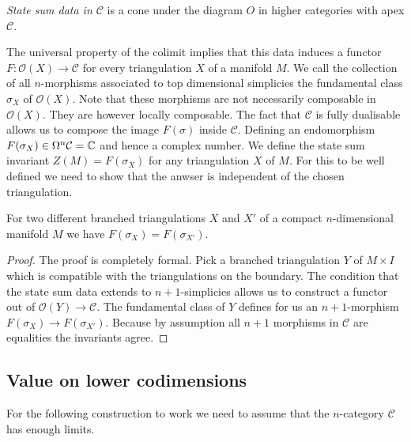 \begin{definition}
	\emph{State sum data in $\mathcal{C}$} is a cone under the diagram $O$ in higher categories with apex $\mathcal{C}$.
\end{definition}

The universal property of the colimit implies that this data induces a functor $F\colon \mathcal{O}(X)\longrightarrow \mathcal{C} $ for every triangulation $X$ of a manifold $M$.
We call the collection of all $n$-morphisms associated to top dimensional simplicies the fundamental class $\sigma_X$ of $\mathcal{O}(X)$.
Note that these morphisms are not necessarily composable in $\mathcal{O}(X)$.
They are however locally composable.
The fact that $\mathcal{C}$ is fully dualisable
allows us to compose the image $F(\sigma)$ inside $\mathcal{C}$.
Defining an endomorphism
$F(\sigma_X)\in \Omega^n\mathcal{C}=\mathbb{C} $ and hence a complex number.
We define the state sum invariant $Z(M)=F(\sigma_X)$ for any triangulation $X$ of $M$.
For this to be well defined we need to show that the anwser is independent of the chosen triangulation.

\begin{theorem}
For two different branched triangulations $X$ and $X'$ of a compact $n$-dimensional manifold $M$ we have $F(\sigma_X)=F(\sigma_{X'})$.
\end{theorem}
\begin{proof}
The proof is completely formal.
Pick a branched triangulation $Y$ of $M\times I$ which is compatible with the triangulations on the boundary.
The condition that the state sum data extends to $n+1$-simplicies allows us to construct a functor out of $\mathcal{O}(Y)\longrightarrow \mathcal{C}$.
The fundamental class of $Y$ defines for us an $n+1$-morphism $F(\sigma_X)\longrightarrow F(\sigma_{X'})$.
Because by assumption all $n+1$ morphisms in $\mathcal{C}$ are equalities the invariants agree.

\end{proof}
\begin{remark}
\end{remark}



\subsection{Value on lower codimensions}
For the following construction to work we need to assume that the $n$-category $\mathcal{C}$ has enough limits.

